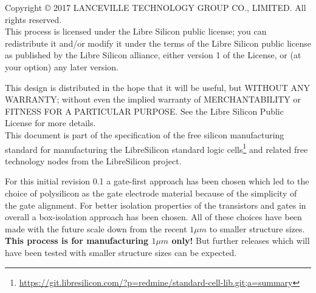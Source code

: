 Copyright © 2017 LANCEVILLE TECHNOLOGY GROUP CO., LIMITED. All rights reserved. \\

This process is licensed under the Libre Silicon public license; you can redistribute it and/or modify it under the terms of the Libre Silicon public license
as published by the Libre Silicon alliance, either version 1 of the License, or (at your option) any later version.

This design is distributed in the hope that it will be useful, but WITHOUT ANY WARRANTY; without even the implied warranty of MERCHANTABILITY or FITNESS FOR A PARTICULAR PURPOSE.
See the Libre Silicon Public License for more details. \\

This document is part of the specification of the free silicon manufacturing standard for manufacturing the LibreSilicon standard logic cells\footnote{\url{https://git.libresilicon.com/?p=redmine/standard-cell-lib.git;a=summary}} and related free technology nodes from the LibreSilicon project.

For this initial revision 0.1 a gate-first approach has been chosen which led to the choice of polysilicon as the gate electrode material because of the simplicity of the gate alignment.
For better isolation properties of the transistors and gates in overall a box-isolation approach has been chosen.
All of these choices have been made with the future scale down from the recent $1 \mu m$ to smaller structure sizes.
\textbf{This process is for manufacturing $1 \mu m$ only!}
But further releases which will have been tested with smaller structure sizes can be expected.
